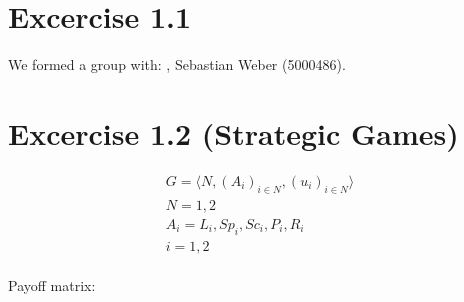 \documentclass[a4paper,
  twoside, %
  headlines=2.1 %
  ]{scrartcl}
\author{\yourname}
\title{\lecture}
\subtitle{Exercise Sheet \sheetnum}
\date{} %
\begin{document}
\maketitle

\section{Excercise 1.1}
We formed a group with: , Sebastian Weber (5000486).

\section{Excercise 1.2 (Strategic Games)}

\begin{align}
	G = \langle N, (A_i)_{i\in N}, (u_i)_{i \in N}\rangle\\
	N = {1,2}\\
	A_i = {L_i, Sp_i, Sc_i, P_i, R_i}\\
	i = 1,2
\end{align}\\
Payoff matrix:\\
\end{document}
